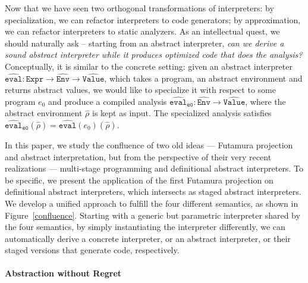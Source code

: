 Now that we have seen two orthogonal transformations of interpreters: by
specialization, we can refactor interpreters to code generators; by
approximation, we can refactor interpreters to static analyzers. As an
intellectual quest, we should naturally ask -- starting from an abstract
interpreter, \textit{can we derive a sound abstract interpreter while it
produces optimized code that does the analysis?}
Conceptually, it is similar to the concrete setting: given an
abstract interpreter $\widehat{\texttt{eval}}: \texttt{Expr} \to
\widehat{\texttt{Env}} \to \widehat{\texttt{Value}}$, which takes a program, an abstract
environment and returns abstract values, we would like to specialize it with
respect to some program $e_0$ and produce a compiled analysis
$\widehat{\texttt{eval}}_{\texttt{e0}} : \widehat{\texttt{Env}} \to
\widehat{\texttt{Value}}$, where the abstract environment $\widehat{\rho}$ is kept as input.
The specialized analysis satisfies $\widehat{\texttt{eval}}_{\texttt{e0}}(\widehat{\rho}) =
\widehat{\texttt{eval}}(e_0)(\widehat{\rho})$.

In this paper, we study the confluence of two old ideas --- Futamura projection
and abstract interpretation, but from the perspective of their very recent
realizations --- multi-stage programming and definitional abstract interpreters.
To be specific, we present the application of the first Futamura projection on
definitional abstract interpreters, which intersects as staged abstract
interpreters. We develop a unified approach to fulfill the four different
semantics, as shown in Figure~\ref{confluence}. Starting with a generic but
parametric interpreter shared by the four semantics, by simply instantiating
the interpreter differently, we can automatically derive a concrete interpreter,
or an abstract interpreter, or their staged versions that generate code, respectively.

\iffalse
embedded domain-specific languages \cite{DBLP:conf/snapl/RompfBLSJAOSKDK15,
DBLP:journals/jfp/CaretteKS09, DBLP:conf/icfp/GibbonsW14,
Hofer:2008:PED:1449913.1449935},
The key idea that enables this flexibility is to use abstract type members first
abstract over concrete/abstract components (e.g., concrete values or abstract
values), then as well as the binding-time of them (e.g., static or dynamic). By
staging, the overhead caused by the monadic layers is eliminated in the
generated code.
\fi

\paragraph{Abstraction without Regret}


